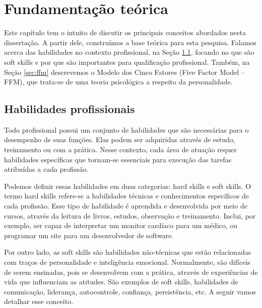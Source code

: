 

\chapter{Fundamentação teórica}

\label{chap:theorical}

Este capítulo tem o intuito de discutir os principais conceitos abordados nesta dissertação. A partir dele, construímos a base teórica para esta pesquisa. Falamos acerca das habilidades no contexto profissional, na Seção \ref{sec:sskills}, focando no que são soft skills e por que são importantes para qualificação profissional. Também, na Seção \ref{sec:ffm} descrevemos o Modelo dos Cinco Fatores (Five Factor Model – FFM), que trata-se de uma teoria psicológica a respeito da personalidade.

\section{Habilidades profissionais}
\label{sec:sskills}

Todo profissional possui um conjunto de habilidades que são necessárias para o desempenho de suas funções. Elas podem ser adquiridas através de estudo, treinamento ou com a prática. Nesse contexto, cada área de atuação requer habilidades específicas que tornam-se essenciais para execução das tarefas atribuídas a cada profissão.

Podemos definir essas habilidades em duas categorias: hard skills e soft skills. O termo hard skills refere-se a habilidades técnicas e conhecimentos específicos de cada profissão. Esse tipo de habilidade é aprendida e desenvolvida por meio de cursos, através da leitura de livros, estudos, observação e treinamento. Inclui, por exemplo, ser capaz de interpretar um monitor cardíaco para um médico, ou programar um site para um desenvolvedor de software.

Por outro lado, as soft skills são habilidades não-técnicas que estão relacionadas com traços de personalidade e inteligência emocional. Normalmente, são difíceis de serem ensinadas, pois se desenvolvem com a prática, através de experiências de vida que influenciam as atitudes. São exemplos de soft skills, habilidades de comunicação, liderança, autocontrole, confiança, persistência, etc. A seguir vamos detalhar esse conceito.

